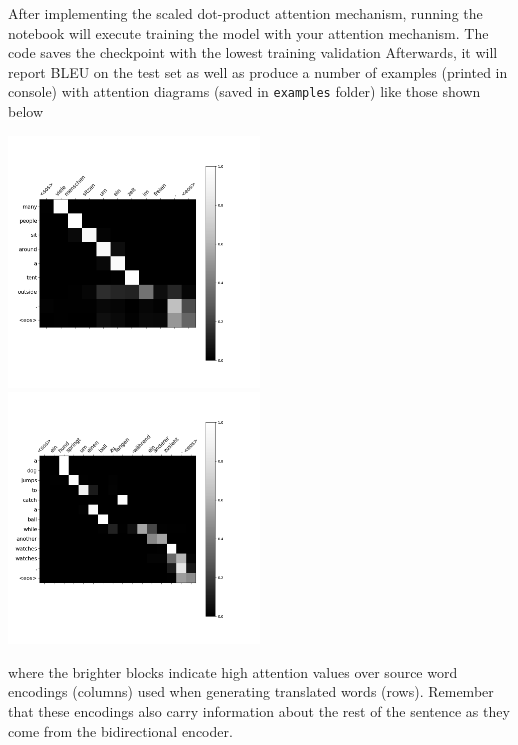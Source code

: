 \documentclass[a4paper,10pt]{article}
\begin{document}
After implementing the scaled dot-product attention mechanism, running the notebook will execute training the model with your attention mechanism. The code saves the checkpoint with the lowest training validation Afterwards, it will report BLEU on the test set as well as produce a number of examples (printed in console) with attention diagrams (saved in \texttt{examples} folder) like those shown below

\includegraphics[width=0.5\textwidth]{figures/ex2.png}
\includegraphics[width=0.5\textwidth]{figures/ex4.png}

\noindent where the brighter blocks indicate high attention values over source word encodings (columns) used when generating translated words (rows). Remember that these encodings also carry information about the rest of the sentence as they come from the bidirectional encoder.

\vspace{5pt}
\begin{taskbox}
\end{taskbox}
\vspace{5pt}
\end{document}
